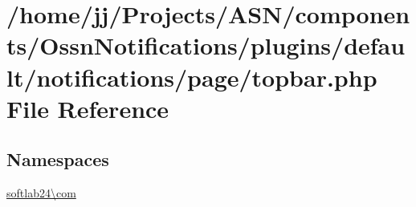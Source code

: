 \hypertarget{components_2_ossn_notifications_2plugins_2default_2notifications_2page_2topbar_8php}{}\section{/home/jj/\+Projects/\+A\+S\+N/components/\+Ossn\+Notifications/plugins/default/notifications/page/topbar.php File Reference}
\label{components_2_ossn_notifications_2plugins_2default_2notifications_2page_2topbar_8php}
\subsection*{Namespaces}
\begin{DoxyCompactItemize}
\item 
 \hyperlink{namespacesoftlab24_1_1com}{softlab24\textbackslash{}com}
\end{DoxyCompactItemize}

